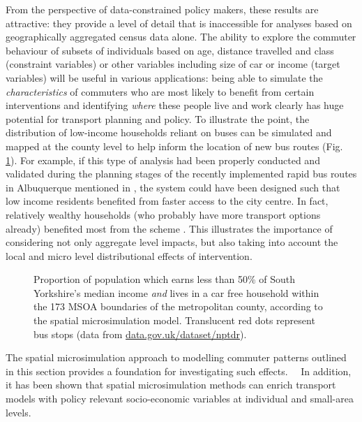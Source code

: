 \documentclass[a4paper, 11pt, twoside]{Thesis}
\begin{document}
From the perspective of data-constrained policy makers, these results are attractive:
they provide a level of detail that is inaccessible for analyses
based on geographically aggregated census data alone. The ability
to explore the commuter behaviour of subsets of individuals based on age,
distance travelled and class (constraint variables) or other variables
including size of car or income (target variables) will be useful in
various applications:
being able to simulate the \emph{characteristics} of commuters who are most
likely to benefit from certain interventions and identifying \emph{where} these
people live and work clearly has huge potential for transport planning and policy.
To illustrate the point, the
distribution of low-income households reliant on buses can be simulated and mapped
at the county level to help inform the location of new bus routes (Fig.
\ref{fig:busmap}). For example, if this type of analysis had been properly
conducted and validated during the planning stages of the recently implemented
rapid bus routes in Albuquerque mentioned in \citet{Tribby2012},
the system could have been
designed such that low income residents benefited from faster access to the city
centre. In fact, relatively wealthy households (who probably have more transport
options already) benefited most from the scheme \citep{Tribby2012}. This
illustrates the importance of considering not only aggregate level impacts, but
also taking into account the local and micro level distributional effects of
intervention.

\begin{figure}[h*]
 \centering
 \caption[Low-income car-free families and bus-stops in South Yorkshire]
 {Proportion of population which earns less than 50\% of South
Yorkshire's median income \emph{and} lives in a car free household within the 173 MSOA
boundaries of the metropolitan county, according to the spatial
microsimulation model. Translucent red dots represent bus
stops (data from {\color{blue}\href{http://data.gov.uk/dataset/nptdr}{data.gov.uk/dataset/nptdr}}).}
 \label{fig:busmap}
\end{figure}

The spatial microsimulation approach to modelling commuter
patterns outlined in this section provides a foundation for investigating such
effects. 　In addition, it has been shown that spatial microsimulation methods
can enrich transport models with policy relevant socio-economic variables at
individual and small-area levels.
\end{document}
